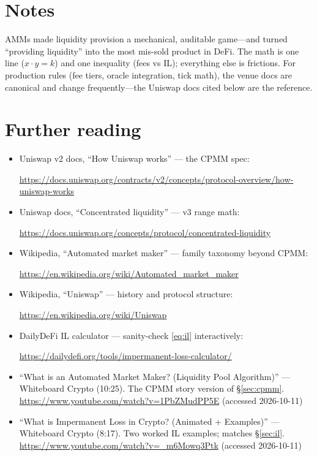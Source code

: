 \section*{Notes}
AMMs made liquidity provision a mechanical, auditable game---and turned ``providing
liquidity'' into the most mis-sold product in DeFi. The math is one line ($x\cdot y=k$) and
one inequality (fees vs IL); everything else is frictions. For production rules (fee tiers,
oracle integration, tick math), the venue docs are canonical and change frequently---the
Uniswap docs cited below are the reference.

\section*{Further reading}
\begin{itemize}
\item Uniswap v2 docs, ``How Uniswap works'' --- the CPMM spec:

\url{https://docs.uniswap.org/contracts/v2/concepts/protocol-overview/how-uniswap-works}
\item Uniswap docs, ``Concentrated liquidity'' --- v3 range math:

\url{https://docs.uniswap.org/concepts/protocol/concentrated-liquidity}
\item Wikipedia, ``Automated market maker'' --- family taxonomy beyond CPMM:

\url{https://en.wikipedia.org/wiki/Automated_market_maker}
\item Wikipedia, ``Uniswap'' --- history and protocol structure:

\url{https://en.wikipedia.org/wiki/Uniswap}
\item DailyDeFi IL calculator --- sanity-check \eqref{eq:il} interactively:

\url{https://dailydefi.org/tools/impermanent-loss-calculator/}
\end{itemize}

\begin{rulebox}
\begin{itemize}
\item ``What is an Automated Market Maker? (Liquidity Pool Algorithm)'' --- Whiteboard Crypto
(10:25). The CPMM story version of \S\ref{sec:cpmm}.
\url{https://www.youtube.com/watch?v=1PbZMudPP5E} (accessed 2026-10-11)
\item ``What is Impermanent Loss in Crypto? (Animated + Examples)'' --- Whiteboard Crypto
(8:17). Two worked IL examples; matches \S\ref{sec:il}.
\url{https://www.youtube.com/watch?v=_m6Mowq3Ptk} (accessed 2026-10-11)
\end{itemize}
\end{rulebox}
